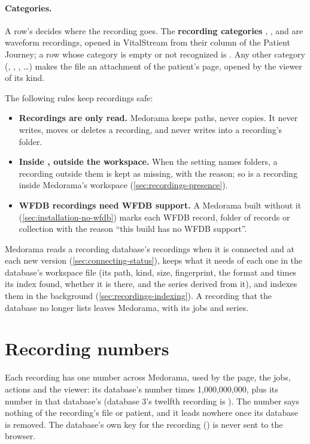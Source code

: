 \paragraph{Categories.} A row's  decides where the recording goes. The
\textbf{recording categories} , ,  and  are waveform
recordings, opened in VitalStream from their column of the Patient Journey; a row whose category
is empty or not recognized is . Any other category (, ,
,  \dots) makes the file an attachment of the patient's page, opened by the
viewer of its kind.

The following rules keep recordings safe:
\begin{itemize}
\item \textbf{Recordings are only read.} Medorama keeps paths, never copies. It never writes,
  moves or deletes a recording, and never writes into a recording's folder.
\item \textbf{Inside , outside the workspace.} When the setting names folders,
  a recording outside them is kept as missing, with the reason; so is a recording inside
  Medorama's workspace (\cref{sec:recordings-presence}).
\item \textbf{WFDB recordings need WFDB support.} A Medorama built without it
  (\cref{sec:installation-no-wfdb}) marks each WFDB record, folder of records or collection with
  the reason ``this build has no WFDB support''.
\end{itemize}
Medorama reads a recording database's recordings when it is connected and at each new version
(\cref{sec:connecting-status}), keeps what it needs of each one in the database's workspace file
 (its path, kind, size, fingerprint, the format and times its index found,
whether it is there, and the series derived from it), and indexes them in the background
(\cref{sec:recordings-indexing}). A recording that the database no longer lists leaves Medorama,
with its jobs and series.

\section{Recording numbers}
\label{sec:recordings-numbers}

Each recording has one number across Medorama, used by the page, the jobs, actions and the
viewer: its database's number times 1{,}000{,}000{,}000, plus its number in that database's
 (database 3's twelfth recording is ). The number says
nothing of the recording's file or patient, and it leads nowhere once its database is removed.
The database's own key for the recording () is never sent to the browser.


